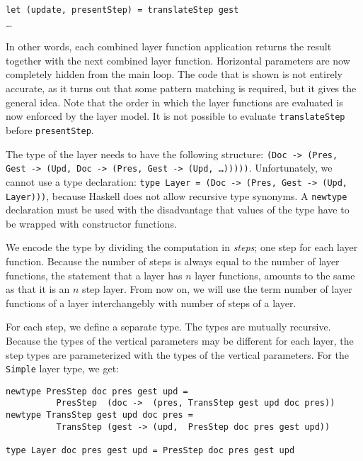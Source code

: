 {\tt let (update, presentStep) = translateStep gest}\\
\dots
\par In other words, each combined layer function application returns the
      result together with the next combined layer function. Horizontal parameters
      are now completely hidden from the main loop. The code that is shown is not
      entirely accurate, as it turns out that some pattern matching is required, but
      it gives the general idea. Note that the order in which the layer functions are
      evaluated is now enforced by the layer model. It is not possible to evaluate
      \texttt{translateStep} before \texttt{presentStep}.
\par {}The type of the layer needs to
      have the following structure: \texttt{(Doc -> (Pres, Gest -> (Upd, Doc ->
      (Pres, Gest -> (Upd, \dots)))))}. Unfortunately, we cannot use a type
      declaration: \texttt{type Layer = (Doc -> (Pres, Gest -> (Upd, Layer)))},
      because Haskell does not allow recursive type synonyms. A \texttt{newtype}
      declaration must be used with the disadvantage that values of the type have to
      be wrapped with constructor functions.
\par We encode the type by dividing the computation in {\em steps}; one
      step for each layer function. Because the number of steps is always equal to
      the number of layer functions, the statement that a layer has $n$ layer
      functions, amounts to the same as that it is an $n$ step layer. From now on, we
      will use the term number of layer functions of a layer interchangebly with
      number of steps of a layer.
\par For each step, we define a separate type. The types are mutually
      recursive. Because the types of the vertical parameters may be different for
      each layer, the step types are parameterized with the types of the vertical
      parameters. For the \texttt{Simple} layer type, we get:\begin{small}\begin{verbatim}newtype PresStep doc pres gest upd = 
          PresStep  (doc ->  (pres, TransStep gest upd doc pres))
newtype TransStep gest upd doc pres = 
          TransStep (gest -> (upd,  PresStep doc pres gest upd)) 

type Layer doc pres gest upd = PresStep doc pres gest upd\end{verbatim}\end{small}

